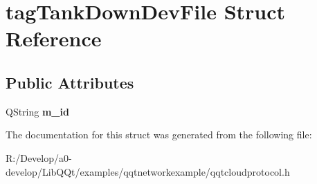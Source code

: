 \hypertarget{structtag_tank_down_dev_file}{}\section{tag\+Tank\+Down\+Dev\+File Struct Reference}
\label{structtag_tank_down_dev_file}
\subsection*{Public Attributes}
\begin{DoxyCompactItemize}
\item 
\mbox{\label{structtag_tank_down_dev_file_a84596e07bcef9c0e348f29aa7e13cf5f}} 
Q\+String {\bfseries m\+\_\+id}
\end{DoxyCompactItemize}


The documentation for this struct was generated from the following file\+:\begin{DoxyCompactItemize}
\item 
R\+:/\+Develop/a0-\/develop/\+Lib\+Q\+Qt/examples/qqtnetworkexample/qqtcloudprotocol.\+h\end{DoxyCompactItemize}
